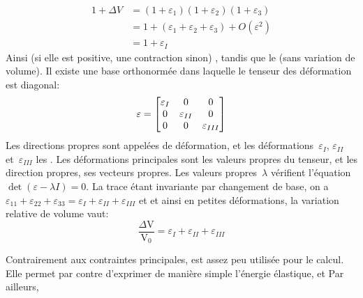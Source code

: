 \begin{equation}\begin{aligned}
	1 + \Delta V &= (1+\varepsilon_1) (1+\varepsilon_2) (1+\varepsilon_3)\\
		& = 1+( \varepsilon_1+\varepsilon_2+\varepsilon_3)+O(\varepsilon^2) \\
		&= 1+\varepsilon_I
\end{aligned}\end{equation}
Ainsi  (si elle est positive, une contraction sinon) , tandis que le  (sans variation de volume).
\medskipvm
Il existe une base orthonormée dans laquelle le tenseur des déformation est diagonal:
\begin{equation} \varepsilon = \MM*{\varepsilon_I &0&0\\ 0&\varepsilon_{II}&0\\ 0&0&\varepsilon_{III}} \end{equation}
Les directions propres sont appelées  de déformation, et les déformations~$\varepsilon_I$, $\varepsilon_{II}$ et~$\varepsilon_{III}$ les .
\medskipvm
Les déformations principales sont les valeurs propres du tenseur, et les direction propres, ses vecteurs propres. Les valeurs propres~$\lambda$ vérifient l'équation~$\det(\varepsilon - \lambda I) = 0$.
\medskipvm
{} La trace étant invariante par changement de base, on a~$\varepsilon_{11}+\varepsilon_{22}+\varepsilon_{33} =\varepsilon_{I}+\varepsilon_{II}+\varepsilon_{III}$ et et ainsi en petites déformations, la variation relative de volume vaut:
\begin{equation}
  \frac{\Delta \mathrm{V}}{\mathrm{V}_0} = \varepsilon_{I} + \varepsilon_{II} + \varepsilon_{III}
\end{equation}

Contrairement aux contraintes principales,  est assez peu utilisée pour le calcul. Elle permet par contre d'exprimer de manière simple l'énergie élastique, et 
Par ailleurs, 


